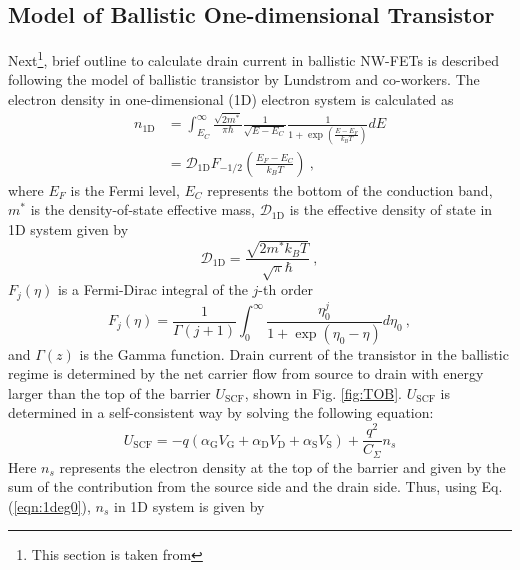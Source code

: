 \documentclass[11pt,uplatex,a4paper]{jsarticle}
\begin{document}
\subsection{Model of Ballistic One-dimensional Transistor} %
Next\footnote{This section is taken from },
brief outline to calculate drain current in ballistic NW-FETs is described following the
model of ballistic transistor by Lundstrom and co-workers\cite{LG,Rahman:2003ug}. 
The electron density in one-dimensional (1D) electron system is calculated as
\begin{align}
 n_{\mathrm{1D}} &= \int_{E_C}^\infty \frac{\sqrt{2 m^*}}{\pi \hbar}\frac{1}{\sqrt{E-E_{C}}}  \frac{1}{1+\exp\left(\frac{E - E_F}{k_B T}\right)} dE \\
 &= \mathcal{D}_{\mathrm{1D}} F_{-1/2}\left( \frac{E_F-E_C}{k_B T}
 \right) \ ,
 \label{eqn:1deg0}
\end{align}
where $E_F$ is the Fermi level,
$E_C$ represents the bottom of the conduction band, $m^*$ is the density-of-state effective mass,
$\mathcal{D}_{\mathrm{1D}}$ is the effective density of state in 1D system given by
\begin{equation}
 \mathcal{D}_{\mathrm{1D}} = \frac{\sqrt{2 m^* k_B T}}{\sqrt{\pi} \hbar} \ , 
\end{equation}
$F_j(\eta)$ is a Fermi-Dirac integral of the $j$-th order
\begin{equation}
 F_{j}(\eta) = \frac{1}{\Gamma(j+1)} \int_0^\infty \frac{\eta_0^j}{1+\exp(\eta_0-\eta)} d \eta_0 \ , 
\end{equation}
and $\Gamma(z)$ is the Gamma function.
Drain current of the transistor in the ballistic regime is determined by the net carrier flow
from source to drain with energy larger than the top of the barrier $U_{\mathrm{SCF}}$, shown in Fig. \ref{fig:TOB}.  
$U_{\mathrm{SCF}}$ is determined in a self-consistent way by solving the following equation:
\begin{equation}
 U_{\mathrm{SCF}} = -q(\alpha_{\mathrm{G}} V_{\mathrm{G}} + \alpha_{\mathrm{D}} V_{\mathrm{D}} + \alpha_{\mathrm{S}} V_{\mathrm{S}}) + \frac{q^2}{C_{\Sigma}} n_s
  \label{eqn:tob1D1}
\end{equation}
Here $n_s$ represents the electron density at the top of the barrier and given by the sum of the contribution from the
source side and the drain side.
Thus, using Eq. (\ref{eqn:1deg0}), $n_s$ in 1D system is given by
\end{document}
